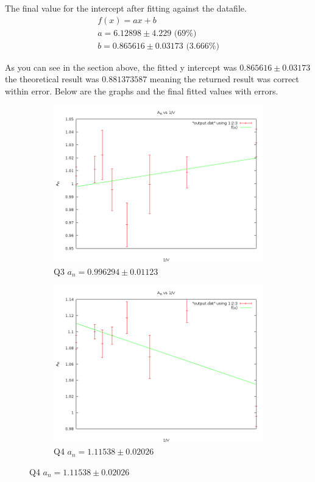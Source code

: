 \documentclass[10pt,a4paper]{article}
\begin{document}
The final value for the intercept after fitting against the datafile.
\begin{equation}
\begin{split}
f(x) = a x + b \\
a = 6.12898 \pm 4.229 \textrm{ (69\%)}\\
b = 0.865616 \pm 0.03173     \textrm{ (3.666\%)}
\end{split}
\end{equation}

As you can see in the section above, the fitted y intercept was $0.865616 \pm 0.03173$ the theoretical result was $0.881373587$ meaning the returned result was correct within error.
Below are the graphs and the final fitted values with errors.

\begin{figure}[H]
\centering
\begin{subfigure}[b]{0.45\textwidth}
    \includegraphics[width=\textwidth]{q3variousgrid.png}
    \caption{Q3 $a_n = 0.996294 \pm 0.01123$}
\end{subfigure}
\begin{subfigure}[b]{0.45\textwidth}
    \includegraphics[width=\textwidth]{q4variousgrid.png}
    \caption{Q4 $a_n = 1.11538 \pm 0.02026$}
\end{subfigure}


\end{figure}
\end{document}
